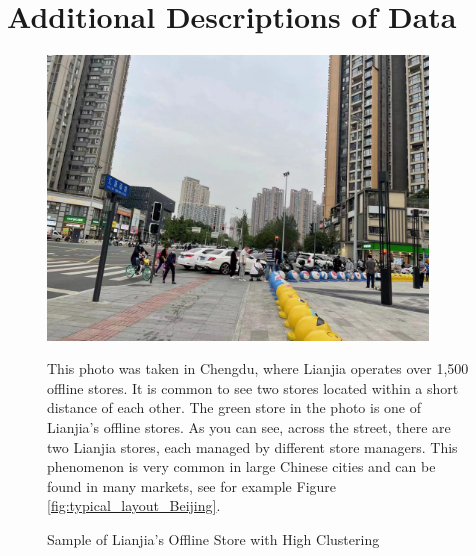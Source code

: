\documentclass[11pt]{article}
\begin{document}


















\newpage
\appendix
\setcounter{table}{0}
\renewcommand{\tablename}{Appendix Table}
\renewcommand{\figurename}{Appendix Figure}
\renewcommand{\thetable}{A\arabic{table}}
\setcounter{figure}{0}
\renewcommand{\thefigure}{A\arabic{figure}}

\section{Additional Descriptions of Data} \label{sec:appendix_data}

\begin{figure}[H]
  \centering
  \includegraphics[width=0.9\textwidth]{../figures/typical_sample_lianjia.pdf}
  \caption{Sample of Lianjia's Offline Store with High Clustering}
  \label{fig:typical_sample_lianjia}
  
  This photo was taken in Chengdu, where Lianjia operates over 1,500 offline stores. It is common to see two stores located within a short distance of each other. The green store in the photo is one of Lianjia's offline stores. As you can see, across the street, there are two Lianjia stores, each managed by different store managers. This phenomenon is very common in large Chinese cities and can be found in many markets, see for example Figure \ref{fig:typical_layout_Beijing}.
\end{figure}
\end{document}

